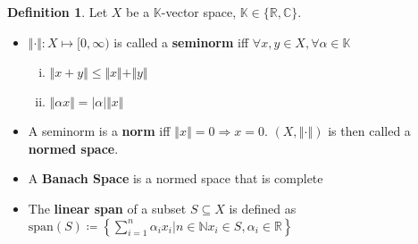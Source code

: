 \documentclass[10pt,a4paper]{article}
\theoremstyle{definition}
\newtheorem{definition}{Definition}
\theoremstyle{cor}
\theoremstyle{theorem}
\theoremstyle{lemma}
\theoremstyle{example}
\theoremstyle{remark}
\newcommand{\norm}[1]{\left\Vert #1 \right\Vert}
\begin{document}
\begin{definition}
Let $X$ be a $\mathbb{K}$-vector space, $\mathbb{K}\in\{\mathbb{R}, \mathbb{C}\}$.
\begin{itemize}
\item $\Vert\cdot\Vert : X \mapsto [0, \infty)$ is called a \textbf{seminorm} iff $\forall x, y \in X, \forall \alpha\in\mathbb{K}$
\begin{enumerate}[(i)]
\item $\Vert x + y \Vert \leq \Vert x \Vert + \Vert y \Vert$
\item $\Vert\alpha x \Vert = |\alpha| \Vert x \Vert$
\end{enumerate}
\item A seminorm is a \textbf{norm} iff $\norm{x} = 0 \Rightarrow x = 0$. $(X, \norm{\cdot})$ is then called a \textbf{normed space}.
\item A \textbf{Banach Space} is a normed space that is complete
\item The \textbf{linear span} of a subset $S \subseteq X$ is defined as $\text{span}(S) \coloneqq \left\{ \sum_{i = 1}^{n} \alpha_i x_i | n\in \mathbb{N} x_i \in S, \alpha_i \in \mathbb{R}\right\}$
\end{itemize}
\end{definition}
\end{document}
